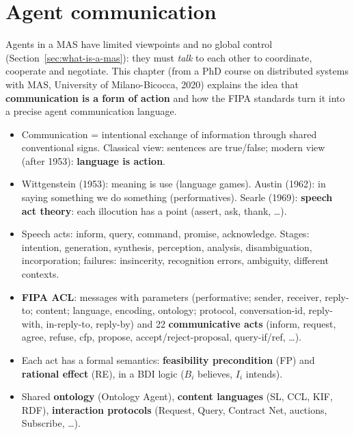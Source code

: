 \section{Agent communication}
\label{sec:agent-communication}

Agents in a MAS have limited viewpoints and no global control
(Section~\ref{sec:what-is-a-mas}): they must \emph{talk} to each other to coordinate,
cooperate and negotiate. This chapter (from a PhD course on distributed systems with MAS,
University of Milano-Bicocca, 2020) explains the idea that \textbf{communication is a form of
action} and how the FIPA standards turn it into a precise agent communication language.





\begin{nbsummary}
\begin{itemize}[nosep]
  \item Communication = intentional exchange of information through shared conventional
        signs. Classical view: sentences are true/false; modern view (after 1953):
        \textbf{language is action}.
  \item Wittgenstein (1953): meaning is use (language games). Austin (1962): in saying
        something we do something (performatives). Searle (1969): \textbf{speech act
        theory}: each illocution has a point (assert, ask, thank, \ldots).
  \item Speech acts: inform, query, command, promise, acknowledge. Stages: intention,
        generation, synthesis, perception, analysis, disambiguation, incorporation; failures:
        insincerity, recognition errors, ambiguity, different contexts.
  \item \textbf{FIPA ACL}: messages with parameters (performative; sender, receiver,
        reply-to; content; language, encoding, ontology; protocol, conversation-id,
        reply-with, in-reply-to, reply-by) and 22 \textbf{communicative acts} (inform,
        request, agree, refuse, cfp, propose, accept/reject-proposal, query-if/ref, \ldots).
  \item Each act has a formal semantics: \textbf{feasibility precondition} (FP) and
        \textbf{rational effect} (RE), in a BDI logic ($B_i$ believes, $I_i$ intends).
  \item Shared \textbf{ontology} (Ontology Agent), \textbf{content languages} (SL, CCL, KIF,
        RDF), \textbf{interaction protocols} (Request, Query, Contract Net, auctions,
        Subscribe, \ldots).
\end{itemize}
\end{nbsummary}
